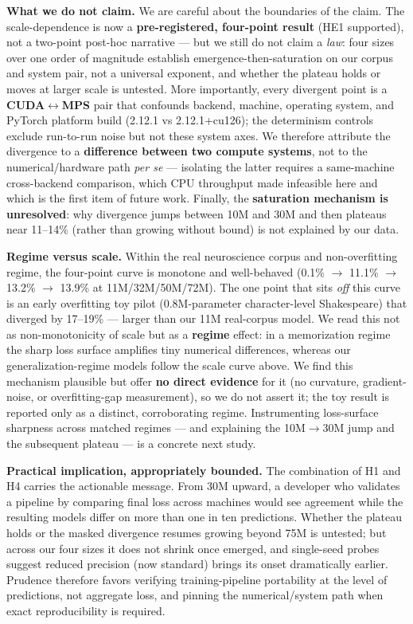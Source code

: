 \documentclass{article}
\begin{document}
\textbf{What we do not claim.} We are careful about the boundaries of the claim. The scale-dependence
is now a \textbf{pre-registered, four-point result} (HE1 supported), not a two-point post-hoc
narrative --- but we still do not claim a \emph{law}: four sizes over one order of magnitude establish
emergence-then-saturation on our corpus and system pair, not a universal exponent, and whether
the plateau holds or moves at larger scale is untested. More importantly, every divergent point
is a \textbf{CUDA$\leftrightarrow$MPS} pair that confounds backend, machine, operating system, and PyTorch platform
build (2.12.1 vs 2.12.1+cu126); the determinism controls exclude run-to-run noise but not these
system axes. We therefore attribute the divergence to a \textbf{difference between two compute
systems}, not to the numerical/hardware path \emph{per se} --- isolating the latter requires a
same-machine cross-backend comparison, which CPU throughput made infeasible here and which is
the first item of future work. Finally, the \textbf{saturation mechanism is unresolved}: why
divergence jumps between 10M and 30M and then plateaus near 11--14\% (rather than growing without
bound) is not explained by our data.

\textbf{Regime versus scale.} Within the real neuroscience corpus and non-overfitting regime, the
four-point curve is monotone and well-behaved (0.1\% $\rightarrow$ 11.1\% $\rightarrow$ 13.2\% $\rightarrow$ 13.9\% at 11M/32M/50M/72M).
The one point that sits \emph{off} this curve is an early overfitting toy pilot
(0.8M-parameter character-level Shakespeare) that diverged by 17--19\% --- larger than our 11M
real-corpus model. We read this not as non-monotonicity of scale but as a \textbf{regime} effect:
in a memorization regime the sharp loss surface amplifies tiny numerical differences, whereas
our generalization-regime models follow the scale curve above. We find this mechanism plausible
but offer \textbf{no direct evidence} for it (no curvature, gradient-noise, or overfitting-gap
measurement), so we do not assert it; the toy result is reported only as a distinct,
corroborating regime. Instrumenting loss-surface sharpness across matched regimes --- and
explaining the 10M$\rightarrow$30M jump and the subsequent plateau --- is a concrete next study.

\textbf{Practical implication, appropriately bounded.} The combination of H1 and H4 carries the
actionable message. From 30M upward, a developer who validates a pipeline by comparing final
loss across machines would see agreement while the resulting models differ on more than one in
ten predictions. Whether the plateau holds or the masked divergence resumes growing beyond 75M
is untested; but across our four sizes it does not shrink once emerged, and single-seed probes
suggest reduced precision (now standard) brings its onset dramatically earlier. Prudence therefore favors verifying training-pipeline portability at the
level of predictions, not aggregate loss, and pinning the numerical/system path when exact
reproducibility is required.
\end{document}

